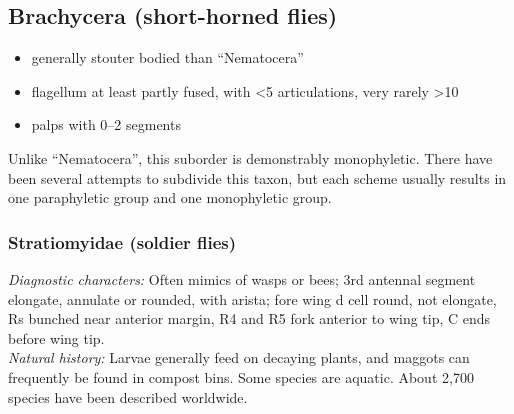 \documentclass[letterpaper, 11pt]{article}
\begin{document}
\subsection{Brachycera (short-horned flies)}
\begin{itemize}
\item generally stouter bodied than ``Nematocera''
\item flagellum at least partly fused, with \textless5 articulations, very rarely \textgreater10
\item palps with 0--2 segments
\end{itemize}
Unlike ``Nematocera'', this suborder is demonstrably monophyletic. There have been several attempts to subdivide this taxon, but each scheme usually results in one paraphyletic group and one monophyletic group.

\subsubsection{Stratiomyidae (soldier flies)}
\noindent{}\textit{Diagnostic characters:} Often mimics of wasps or bees; 3rd antennal segment elongate, annulate or rounded, with arista; fore wing d cell round, not elongate, Rs bunched near anterior margin, R4 and R5 fork anterior to wing tip, C ends before wing tip.\\

\noindent{}\textit{Natural history:} Larvae generally feed on decaying plants, and maggots can frequently be found in compost bins. Some species are aquatic. About 2,700 species have been described worldwide.
\end{document}
